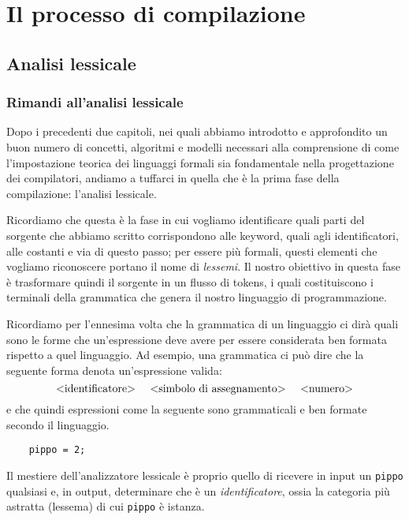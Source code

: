 \documentclass[class=book, crop=false, oneside, 12pt]{standalone}
\begin{document}
\part{Il processo di compilazione}
\chapter{Analisi lessicale}

\section{Rimandi all'analisi lessicale}
Dopo i precedenti due capitoli, nei quali abbiamo introdotto e approfondito un buon numero di concetti, algoritmi e modelli necessari alla comprensione di come l'impostazione teorica dei linguaggi formali sia fondamentale nella progettazione dei compilatori, andiamo a tuffarci in quella che è la prima fase della compilazione: l'analisi lessicale.


Ricordiamo che questa è la fase in cui vogliamo identificare quali parti del sorgente che abbiamo scritto corrispondono alle keyword, quali agli identificatori, alle costanti e via di questo passo; per essere più formali, questi elementi che vogliamo riconoscere portano il nome di \emph{lessemi}. 
Il nostro obiettivo in questa fase è trasformare quindi il sorgente in un flusso di tokens, i quali costituiscono i terminali della grammatica che genera il nostro linguaggio di programmazione.

Ricordiamo per l'ennesima volta che la grammatica di un linguaggio ci dirà quali sono le forme che un'espressione deve avere per essere considerata ben formata rispetto a quel linguaggio. Ad esempio, una grammatica ci può dire che la seguente forma denota un'espressione valida:
\begin{equation*}
    \textrm{<identificatore> \quad <simbolo di assegnamento> \quad <numero>}
\end{equation*}
e che quindi espressioni come la seguente sono grammaticali e ben formate secondo il linguaggio.\\
\begin{verbatim}
    pippo = 2;
\end{verbatim}
Il mestiere dell'analizzatore lessicale è proprio quello di ricevere in input un \texttt{pippo} qualsiasi e, in output, determinare che è un \emph{identificatore}, ossia la categoria più astratta (lessema) di cui \texttt{pippo} è istanza.

\end{document}
